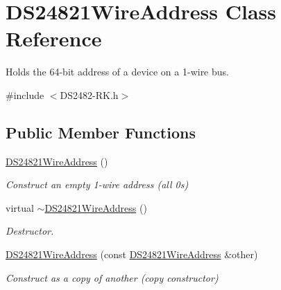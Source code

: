 \hypertarget{class_d_s24821_wire_address}{}\section{D\+S24821\+Wire\+Address Class Reference}
\label{class_d_s24821_wire_address}


Holds the 64-\/bit address of a device on a 1-\/wire bus.  




{\ttfamily \#include $<$D\+S2482-\/\+R\+K.\+h$>$}

\subsection*{Public Member Functions}
\begin{DoxyCompactItemize}
\item 
\mbox{\label{class_d_s24821_wire_address_a150231a85f12d24563dd2546061c1518}} 
\mbox{\hyperlink{class_d_s24821_wire_address_a150231a85f12d24563dd2546061c1518}{D\+S24821\+Wire\+Address}} ()
\begin{DoxyCompactList}\small\item\em Construct an empty 1-\/wire address (all 0s) \end{DoxyCompactList}\item 
\mbox{\label{class_d_s24821_wire_address_a234835cc2611b220716083551b0e9230}} 
virtual \mbox{\hyperlink{class_d_s24821_wire_address_a234835cc2611b220716083551b0e9230}{$\sim$\+D\+S24821\+Wire\+Address}} ()
\begin{DoxyCompactList}\small\item\em Destructor. \end{DoxyCompactList}\item 
\mbox{\label{class_d_s24821_wire_address_ab6fa5e259b1438d43a88fc5190b9d890}} 
\mbox{\hyperlink{class_d_s24821_wire_address_ab6fa5e259b1438d43a88fc5190b9d890}{D\+S24821\+Wire\+Address}} (const \mbox{\hyperlink{class_d_s24821_wire_address}{D\+S24821\+Wire\+Address}} \&other)
\begin{DoxyCompactList}\small\item\em Construct as a copy of another (copy constructor) \end{DoxyCompactList}\item 

\end{DoxyCompactItemize}
